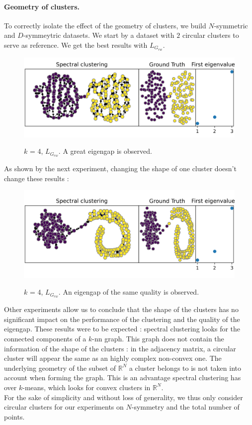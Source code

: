 \documentclass[a4paper,12pt]{article}
\theoremstyle{definition}
\theoremstyle{plain}
\def\R{\mathbb{R}}%
\begin{document}
\paragraph{Geometry of clusters.}
To correctly isolate the effect of the geometry of clusters, we build $N$-symmetric and $D$-symmeytric datasets. We start by a dataset with $2$ circular clusters to serve as reference.
We get the best results with $L_{G_{rw}}$.
\begin{figure}[H]
	\centering
	\includegraphics[width=0.6\linewidth]{figures/base_circles_g_rw}
	\label{fig:base_circles}
	\caption{$k$ = 4, $L_{G_{rw}}$. A great eigengap is observed.}
\end{figure}
As shown by the next experiment, changing the shape of one cluster doesn't change these results :
\begin{figure}[H]
	\centering
	\includegraphics[width=0.6\linewidth]{figures/uneven_blobs_g_rw}
	\label{fig:uneven_blobs}
	\caption{$k$ = 4, $L_{G_{rw}}$. An eigengap of the same quality is observed.}
\end{figure}

Other experiments allow us to conclude that the shape of the clusters has no significant impact on the performance of the clustering and the quality of the eigengap.
These results were to be expected : spectral clustering looks for the connected components of a $k$-nn graph. This graph does not contain the information of the shape of the clusters : in the adjacency matrix, a circular cluster will appear the same as an highly complex non-convex one. The underlying geometry of the subset of $\R^N$ a cluster belongs to is not taken into account when forming the graph. This is an advantage spectral clustering has over $k$-means, which looks for convex clusters in $\R^N$.\\
For the sake of simplicity and without loss of generality, we thus only consider circular clusters for our experiments on $N$-symmetry and the total number of points.
\end{document}

